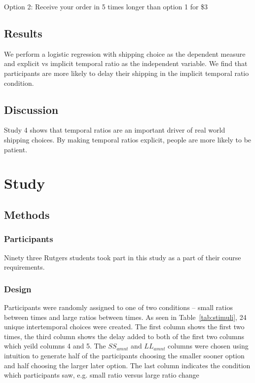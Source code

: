 \documentclass[]{article}
\begin{document}
Option 2: Receive your order in 5 times longer than option 1 for \$3

\subsection{Results}

We perform a logistic regression with shipping choice as the dependent measure and explicit vs implicit temporal ratio as the independent variable. 
We find that participants are more likely to delay their shipping in the implicit temporal ratio condition. 

\subsection{Discussion}

Study 4 shows that temporal ratios are an important driver of real world shipping choices. 
By making temporal ratios explicit, people are more likely to be patient. 

\section{Study}

\subsection{Methods}

\subsubsection{Participants}

Ninety three Rutgers students took part in this study as a part of their course requirements. 

\subsubsection{Design}

Participants were randomly assigned to one of two conditions -- small ratios between times and large ratios between times.  
As seen in Table~\ref{tab:stimuli}, 24 unique intertemporal choices were created. 
The first column shows the first two times, the third column shows the delay added to both of the first two columns which yeild columns 4 and 5. 
The $SS_{amnt}$ and $LL_{amnt}$ columns were chosen using intuition to generate half of the participants choosing the smaller sooner option and half choosing the larger later option. 
The last column indicates the condition which participants saw, e.g. small ratio versus large ratio change
\end{document}
